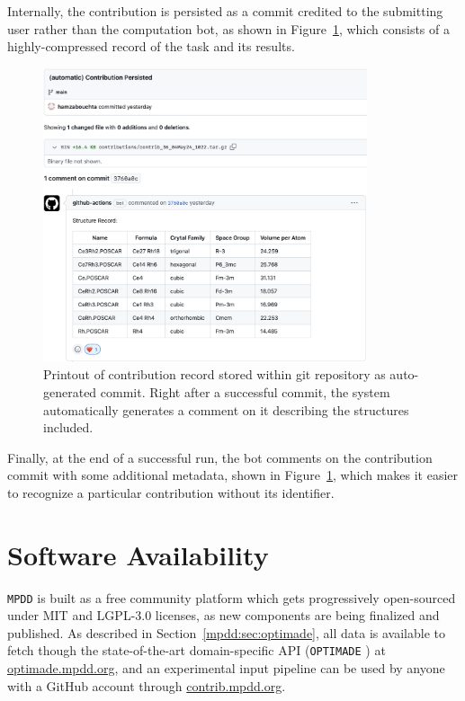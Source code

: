 Internally, the contribution is persisted as a commit credited to the submitting user rather than the computation bot, as shown in Figure~\ref{mpdd:fig:mpddx4}, which consists of a highly-compressed record of the task and its results.

\begin{figure}[H]
    \centering
    \includegraphics[width=0.85\textwidth]{mpdd/mpddx4.png}
    \caption{Printout of contribution record stored within git repository as auto-generated commit. Right after a successful commit, the system automatically generates a comment on it describing the structures included.}
    \label{mpdd:fig:mpddx4}
\end{figure}

Finally, at the end of a successful run, the bot comments on the contribution commit with some additional metadata, shown in Figure~\ref{mpdd:fig:mpddx4}, which makes it easier to recognize a particular contribution without its identifier.


\section{Software Availability} \label{mpdd:sec:softwareavaialbility}

\texttt{MPDD} is built as a free community platform which gets progressively open-sourced under MIT and LGPL-3.0 licenses, as new components are being finalized and published. As described in Section~\ref{mpdd:sec:optimade}, all data is available to fetch though the state-of-the-art domain-specific API (\texttt{OPTIMADE} \cite{Evans2024DevelopmentsExchange}) at \href{https://optimade.mpdd.org}{optimade.mpdd.org}, and an experimental input pipeline can be used by anyone with a GitHub account through \href{https://contrib.mpdd.org}{contrib.mpdd.org}.



\printbibliography[heading=subbibintoc]